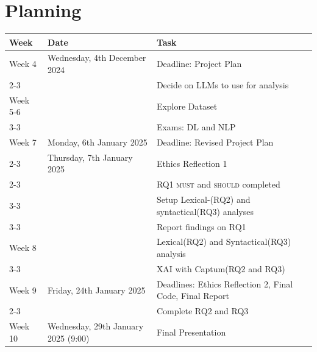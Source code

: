 \section{Planning}

\begin{tabular}{|l|l|p{8cm}|}
\hline
\textbf{Week} & \textbf{Date} & \textbf{Task} \\ \hline
Week 4 & Wednesday, 4th December 2024 & Deadline: Project Plan \\ \cline{2-3}
       &                              & Decide on LLMs to use for analysis \\ \hline
Week 5-6 & & Explore Dataset \\ \cline{3-3}
         & & Exams: DL and NLP \\ \hline
Week 7 & Monday, 6th January 2025 & Deadline: Revised Project Plan \\ \cline{2-3}
       & Thursday, 7th January 2025 & Ethics Reflection 1 \\ \cline{2-3}
       &                           & RQ1 \textsc{must} and \textsc{should} completed \\ \cline{3-3}
       &                           & Setup Lexical-(RQ2) and syntactical(RQ3) analyses\\ \cline{3-3}
       &                           & Report findings on RQ1 \\ \hline
Week 8 & & Lexical(RQ2) and Syntactical(RQ3) analysis \\ \cline{3-3}
       &                           &  XAI with Captum(RQ2 and RQ3) \\ \hline
Week 9 & Friday, 24th January 2025 & Deadlines: Ethics Reflection 2, Final Code, Final Report \\ \cline{2-3}
       &                            & Complete RQ2 and RQ3\\ \hline
Week 10 & Wednesday, 29th January 2025 (9:00) & Final Presentation \\ \hline
\end{tabular}

        
